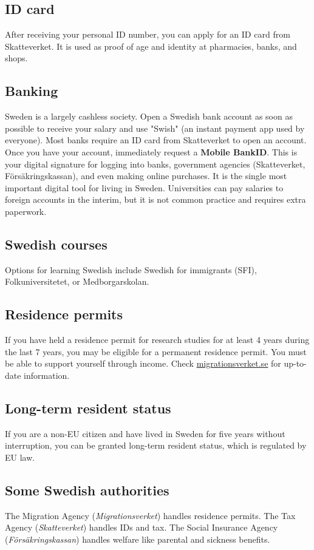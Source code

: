 \documentclass{article}
\begin{document}
\subsection{ID card}
After receiving your personal ID number, you can apply for an ID card from Skatteverket. It is used as proof of age and identity at pharmacies, banks, and shops.

\subsection{Banking}
Sweden is a largely cashless society. Open a Swedish bank account as soon as possible to receive your salary and use "Swish" (an instant payment app used by everyone). Most banks require an ID card from Skatteverket to open an account. Once you have your account, immediately request a \textbf{Mobile BankID}. This is your digital signature for logging into banks, government agencies (Skatteverket, Försäkringskassan), and even making online purchases. It is the single most important digital tool for living in Sweden. Universities can pay salaries to foreign accounts in the interim, but it is not common practice and requires extra paperwork.

\subsection{Swedish courses}
Options for learning Swedish include Swedish for immigrants (SFI), Folkuniversitetet, or Medborgarskolan.

\subsection{Residence permits}
If you have held a residence permit for research studies for at least 4 years during the last 7 years, you may be eligible for a permanent residence permit. You must be able to support yourself through income. Check \url{migrationsverket.se} for up-to-date information.

\subsection{Long-term resident status}
If you are a non-EU citizen and have lived in Sweden for five years without interruption, you can be granted long-term resident status, which is regulated by EU law.

\subsection{Some Swedish authorities}
The Migration Agency (\textit{Migrationsverket}) handles residence permits. The Tax Agency (\textit{Skatteverket}) handles IDs and tax. The Social Insurance Agency (\textit{Försäkringskassan}) handles welfare like parental and sickness benefits.
\end{document}
